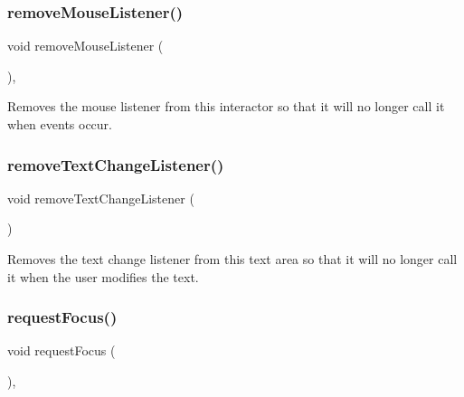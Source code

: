 \mbox{\label{classsgl_1_1GInteractor_aff47f71ce47e688a07c9d38dc92fcc11}} 
\subsubsection{\texorpdfstring{remove\+Mouse\+Listener()}{removeMouseListener()}}
{\footnotesize\ttfamily void remove\+Mouse\+Listener (\begin{DoxyParamCaption}{ }\end{DoxyParamCaption})\hspace{0.3cm}{\ttfamily [virtual]}, {\ttfamily [inherited]}}



Removes the mouse listener from this interactor so that it will no longer call it when events occur. 

\mbox{\label{classsgl_1_1GTextArea_a69c940b99d01eb7c353763ce4b0942a4}} 
\subsubsection{\texorpdfstring{remove\+Text\+Change\+Listener()}{removeTextChangeListener()}}
{\footnotesize\ttfamily void remove\+Text\+Change\+Listener (\begin{DoxyParamCaption}{ }\end{DoxyParamCaption})\hspace{0.3cm}{\ttfamily [virtual]}}



Removes the text change listener from this text area so that it will no longer call it when the user modifies the text. 

\mbox{\label{classsgl_1_1GInteractor_a519fb2ac767f8b2febbb50b898b8c8cb}} 
\subsubsection{\texorpdfstring{request\+Focus()}{requestFocus()}}
{\footnotesize\ttfamily void request\+Focus (\begin{DoxyParamCaption}{ }\end{DoxyParamCaption})\hspace{0.3cm}{\ttfamily [virtual]}, {\ttfamily [inherited]}}



